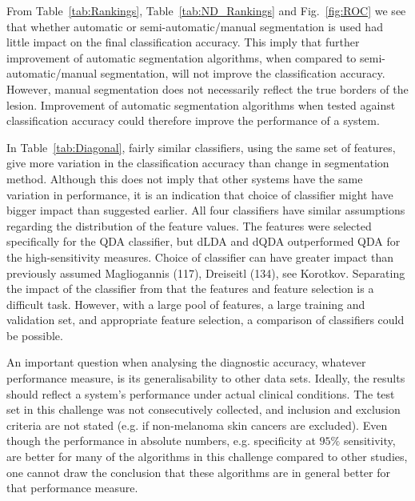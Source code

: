 \documentclass[a4paper,12pt]{article}
\begin{document}
From Table~\ref{tab:Rankings}, Table~\ref{tab:ND_Rankings} and Fig.~\ref{fig:ROC} we see that whether automatic or semi-automatic/manual segmentation is used had little impact on the final classification accuracy.
This imply that further improvement of automatic segmentation algorithms, when compared to semi-automatic/manual segmentation,  will not improve the classification accuracy.
However, manual segmentation does not necessarily reflect the true borders of the lesion.
Improvement of automatic segmentation algorithms when tested against classification accuracy could therefore improve the performance of a system. 

In Table~\ref{tab:Diagonal}, fairly similar classifiers, using the same set of features, give more variation in the classification accuracy than change in segmentation method. 
Although this does not imply that other systems have the same variation in performance, it is an indication that choice of classifier might have bigger impact than suggested earlier.  
All four classifiers have similar assumptions regarding the distribution of the feature values. 
The features were selected specifically for the QDA classifier, but dLDA and dQDA outperformed QDA for the high-sensitivity measures. 
Choice of classifier can have greater impact than previously assumed {\color{red} Magliogannis (117), Dreiseitl (134), see Korotkov}.
Separating the impact of the classifier from that the features and feature selection is a difficult task.
However, with a large pool of features, a large training and validation set, and appropriate feature selection, a comparison of classifiers could be possible. 

An important question when analysing the diagnostic accuracy, whatever performance measure, is its generalisability to other data sets. 
Ideally, the results should reflect a system's performance under actual clinical conditions. 
The test set in this challenge was not consecutively collected, and inclusion and exclusion criteria are not stated (e.g. if non-melanoma skin cancers are excluded). Even though the performance in absolute numbers, e.g. specificity at $95\%$ sensitivity, are better for many of the algorithms in this challenge compared to other studies, one cannot draw the conclusion that these algorithms are in general better for that performance measure. 

\end{document}
